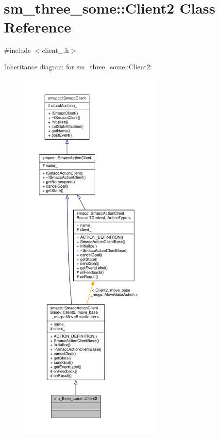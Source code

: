 \hypertarget{classsm__three__some_1_1Client2}{}\section{sm\+\_\+three\+\_\+some\+:\+:Client2 Class Reference}
\label{classsm__three__some_1_1Client2}


{\ttfamily \#include $<$client\+\_.\+h$>$}



Inheritance diagram for sm\+\_\+three\+\_\+some\+:\+:Client2\+:
\nopagebreak
\begin{figure}[H]
\begin{center}
\leavevmode
\includegraphics[height=550pt]{classsm__three__some_1_1Client2__inherit__graph}
\end{center}
\end{figure}


